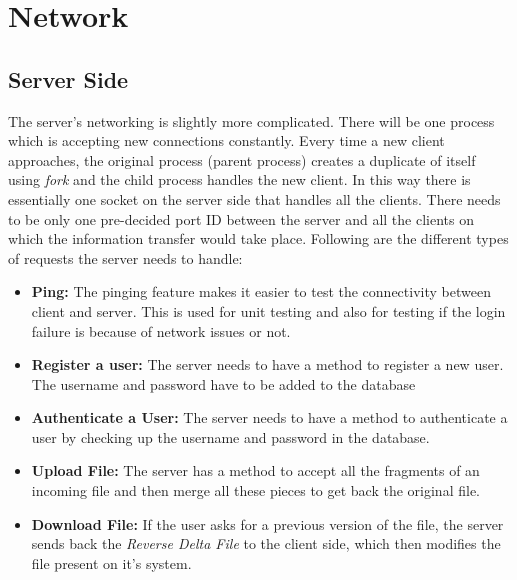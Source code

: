\documentclass[]{article}
\begin{document}
\section{\LARGE Network}

\subsection{Server Side}
The server's networking is slightly more complicated. There will be one process which is accepting new connections constantly. Every time a new client approaches, the original process (parent process) creates a duplicate of itself using \textit{fork} and the child process handles the new client. In this way there is essentially one socket on the server side that handles all the clients. There needs to be only one pre-decided port ID between the server and all the clients on which the information transfer would take place. Following are the different types of requests the server needs to handle:\\
\begin{itemize}
\item \textbf{Ping:} 
The pinging feature makes it easier to test the connectivity between client and server. This is used for unit testing and also for testing if the login failure is because of network issues or not.

\item \textbf{Register a user:}
The server needs to have a method to register a new user. The username and password have to be added to the database

\item \textbf{Authenticate a User:}
The server needs to have a method to authenticate a user by checking up the username and password in the database. 

\item \textbf{Upload File:}
The server has a method to accept all the fragments of an incoming file and then merge all these pieces to get back the original file.

\item \textbf{Download File:}
If the user asks for a previous version of the file, the server sends back the \textit{Reverse Delta File} to the client side, which then modifies the file present on it's system.

\end{itemize} 
\end{document}
